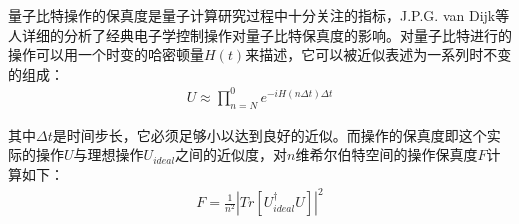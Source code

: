 量子比特操作的保真度是量子计算研究过程中十分关注的指标，J.P.G. van Dijk等人\cite[]{van_Dijk_Kawakami_Schouten_Veldhorst_Vandersypen_Babaie_Charbon_Sebastiano_2019}详细的分析了经典电子学控制操作对量子比特保真度的影响。对量子比特进行的操作可以用一个时变的哈密顿量$H(t)$来描述，它可以被近似表述为一系列时不变的组成：
\begin{align}
    U\approx \prod_{n=N}^{0} e^{-iH(n\Delta t)\Delta t}
\end{align}

其中$\Delta t$是时间步长，它必须足够小以达到良好的近似。而操作的保真度即这个实际的操作$U$与理想操作$U_{ideal}$之间的近似度，对$n$维希尔伯特空间的操作保真度$F$计算如下：
\begin{align}
    F=\frac{1}{n^2}\left|Tr\left[U_{ideal}^{\dagger}U\right]\right|^2
\end{align}






